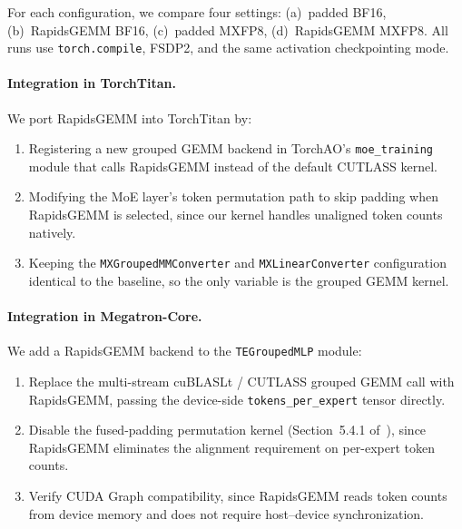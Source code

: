\documentclass[11pt,a4paper]{article}
\theoremstyle{definition}
\begin{document}
For each configuration, we compare four settings:
(a)~padded BF16,
(b)~RapidsGEMM BF16,
(c)~padded MXFP8,
(d)~RapidsGEMM MXFP8.
All runs use \texttt{torch.compile}, FSDP2, and the same
activation checkpointing mode.

\paragraph{Integration in TorchTitan.}
We port RapidsGEMM into TorchTitan by:
\begin{enumerate}
  \item Registering a new grouped GEMM backend in TorchAO's
    \texttt{moe\_training} module that calls RapidsGEMM instead of
    the default CUTLASS kernel.
  \item Modifying the MoE layer's token permutation path to
    skip padding when RapidsGEMM is selected, since our kernel
    handles unaligned token counts natively.
  \item Keeping the \texttt{MXGroupedMMConverter} and
    \texttt{MXLinearConverter} configuration identical to the
    baseline, so the only variable is the grouped GEMM kernel.
\end{enumerate}

\paragraph{Integration in Megatron-Core.}
We add a RapidsGEMM backend to the \texttt{TEGroupedMLP} module:
\begin{enumerate}
  \item Replace the multi-stream cuBLASLt / CUTLASS grouped GEMM
    call with RapidsGEMM, passing the device-side
    \texttt{tokens\_per\_expert} tensor directly.
  \item Disable the fused-padding permutation kernel
    (Section~5.4.1 of~\cite{nvidia2026megatronmoe}), since
    RapidsGEMM eliminates the alignment requirement on
    per-expert token counts.
  \item Verify CUDA Graph compatibility, since RapidsGEMM
    reads token counts from device memory and does not require
    host--device synchronization.
\end{enumerate}
\end{document}
